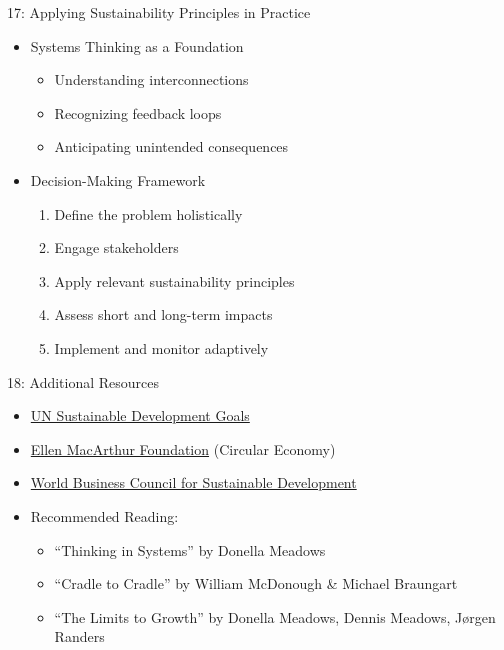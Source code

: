 \documentclass[
  ignorenonframetext,
]{beamer}
\providecommand{\tightlist}{%
  \setlength{\itemsep}{0pt}\setlength{\parskip}{0pt}}\usepackage{longtable,booktabs,array}
\begin{document}
\begin{frame}{17: Applying Sustainability Principles in Practice}
\label{applying-sustainability-principles-in-practice}
\begin{itemize}
\tightlist
\item
  Systems Thinking as a Foundation

  \begin{itemize}
  \tightlist
  \item
    Understanding interconnections
  \item
    Recognizing feedback loops
  \item
    Anticipating unintended consequences
  \end{itemize}
\item
  Decision-Making Framework

  \begin{enumerate}
  \tightlist
  \item
    Define the problem holistically
  \item
    Engage stakeholders
  \item
    Apply relevant sustainability principles
  \item
    Assess short and long-term impacts
  \item
    Implement and monitor adaptively
  \end{enumerate}
\end{itemize}
\end{frame}

\begin{frame}{18: Additional Resources}
\label{additional-resources}
\begin{itemize}
\tightlist
\item
  \href{https://sdgs.un.org/goals}{UN Sustainable Development Goals}
\item
  \href{https://www.ellenmacarthurfoundation.org}{Ellen MacArthur
  Foundation} (Circular Economy)
\item
  \href{https://www.wbcsd.org}{World Business Council for Sustainable
  Development}
\item
  Recommended Reading:

  \begin{itemize}
  \tightlist
  \item
    ``Thinking in Systems'' by Donella Meadows
  \item
    ``Cradle to Cradle'' by William McDonough \& Michael Braungart
  \item
    ``The Limits to Growth'' by Donella Meadows, Dennis Meadows, Jørgen
    Randers
  \end{itemize}
\end{itemize}
\end{frame}
\end{document}
